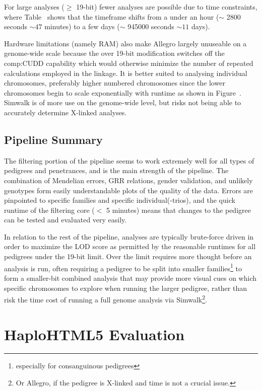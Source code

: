 For large analyses ($\geq$ 19-bit) fewer analyses are possible due to time constraints, where Table~ shows that the timeframe shifts from a under an hour ($\sim$ 2800 seconds $\sim 47$ minutes) to a few days ($\sim$ 945000 seconds $\sim 11$ days). 

Hardware limitations (namely RAM) also make Allegro largely unuseable on a genome-wide scale because the over 19-bit modification switches off the \gls{comp:CUDD} capability which would otherwise minimize the number of repeated calculations employed in the linkage. It is better suited to analysing individual chromosomes, preferably higher numbered chromosomes since the lower chromosomes begin to scale exponentially with runtime as shown in Figure~.  Simwalk is of more use on the genome-wide level, but risks not being able to accurately determine X-linked analyses.


\subsection{Pipeline Summary}

The filtering portion of the pipeline seems to work extremely well for all types of pedigrees and penetrances, and is the main strength of the pipeline. The combination of Mendelian errors, GRR relations, gender validation, and unlikely genotypes form easily understandable plots of the quality of the data. Errors are pinpointed to specific families and specific individual(-trios), and the quick runtime of the filtering core ($<$ 5 minutes) means that changes to the pedigree can be tested and evaluated very easily. 

In relation to the rest of the pipeline, analyses are typically brute-force driven in order to maximize the LOD score as permitted by the reasonable runtimes for all pedigrees under the 19-bit limit. Over the limit requires more thought before an analysis is run, often requiring a pedigree to be split into smaller families\footnote{especially for consanguinous pedigrees}  to form a smaller-bit combined analysis that may provide more visual cues on which specific chromosomes to explore when running the larger pedigree, rather than risk the time cost of running a full genome analysis via Simwalk\footnote{Or Allegro, if the pedigree is X-linked and time is not a crucial issue.}.


\section{HaploHTML5 Evaluation}


